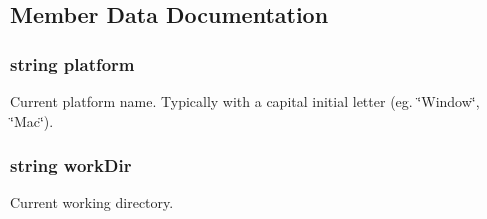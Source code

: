 \subsection{Member Data Documentation}
\hypertarget{class_engine_ab33ce334382344871104873746995d5d}{
\subsubsection[{platform}]{\setlength{\rightskip}{0pt plus 5cm}string platform}}\label{class_engine_ab33ce334382344871104873746995d5d}
Current platform name. Typically with a capital initial letter (eg. \char`\"{}\+Window\char`\"{}, \char`\"{}\+Mac\char`\"{}). \hypertarget{class_engine_a3fe0ea911c35ded34831c9c13e8c3d53}{
\subsubsection[{work\+Dir}]{\setlength{\rightskip}{0pt plus 5cm}string work\+Dir}}\label{class_engine_a3fe0ea911c35ded34831c9c13e8c3d53}
Current working directory. 